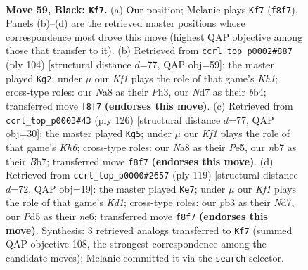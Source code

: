 \documentclass[11pt]{article}
\begin{document}
\clearpage

\begin{figure}[p]\centering
\begin{subfigure}{0.46\textwidth}\centering
\resizebox{\linewidth}{!}{%
\newchessgame
\chessboard[
  setfen={n4k2/1N1n4/1b6/p2p2Bb/8/PP2P2p/4P3/3B2K1 b - - 0 59},
  showmover=false,
  pgfstyle=straightmove, color=movearrow, markmove={f8-f7}
]}
\caption{}
\end{subfigure}\hfill
\begin{subfigure}{0.46\textwidth}\centering
\resizebox{\linewidth}{!}{%
\newchessgame
\chessboard[
  setfen={5r1k/2R3p1/7p/p3B2n/1bN5/1P3P1P/8/7K w - - 1 53},
  showmover=false,
  pgfstyle=straightmove, color=movearrow, markmove={h1-g2}
]}
\caption{}
\end{subfigure}
\\[4pt]
\begin{subfigure}{0.46\textwidth}\centering
\resizebox{\linewidth}{!}{%
\newchessgame
\chessboard[
  setfen={6k1/1B3p2/Pb4pK/2p1P2p/7P/3bB1P1/8/8 w - - 3 64},
  showmover=false,
  pgfstyle=straightmove, color=movearrow, markmove={h6-g5}
]}
\caption{}
\end{subfigure}\hfill
\begin{subfigure}{0.46\textwidth}\centering
\resizebox{\linewidth}{!}{%
\newchessgame
\chessboard[
  setfen={3k4/3n4/2p1Npb1/6pp/1K1PP3/6P1/2B3P1/8 b - - 28 60},
  showmover=false,
  pgfstyle=straightmove, color=movearrow, markmove={d8-e7}
]}
\caption{}
\end{subfigure}
\caption{\textbf{Move 59, Black: \texttt{Kf7}.} (a) Our position; Melanie plays \texttt{Kf7} (\texttt{f8f7}). Panels (b)--(d) are the retrieved master positions whose correspondence most drove this move (highest QAP objective among those that transfer to it). (b) Retrieved from \texttt{ccrl\_top\_p0002\#887} (ply 104) [structural distance $d$=77, QAP obj=59]: the master played \texttt{Kg2}; under $\mu$ our \emph{Kf1} plays the role of that game's \emph{Kh1}; cross-type roles: our \emph{N}a8 as their \emph{P}h3, our \emph{N}d7 as their \emph{b}b4; transferred move \texttt{f8f7} \textbf{(endorses this move)}. (c) Retrieved from \texttt{ccrl\_top\_p0003\#43} (ply 126) [structural distance $d$=77, QAP obj=30]: the master played \texttt{Kg5}; under $\mu$ our \emph{Kf1} plays the role of that game's \emph{Kh6}; cross-type roles: our \emph{N}a8 as their \emph{P}e5, our \emph{n}b7 as their \emph{B}b7; transferred move \texttt{f8f7} \textbf{(endorses this move)}. (d) Retrieved from \texttt{ccrl\_top\_p0000\#2657} (ply 119) [structural distance $d$=72, QAP obj=19]: the master played \texttt{Ke7}; under $\mu$ our \emph{Kf1} plays the role of that game's \emph{Kd1}; cross-type roles: our \emph{p}b3 as their \emph{N}d7, our \emph{P}d5 as their \emph{n}e6; transferred move \texttt{f8f7} \textbf{(endorses this move)}. Synthesis: 3 retrieved analogs transferred to \texttt{Kf7} (summed QAP objective 108, the strongest correspondence among the candidate moves); Melanie committed it via the \texttt{search} selector.}
\label{fig:thought-m117}
\end{figure}
\end{document}
